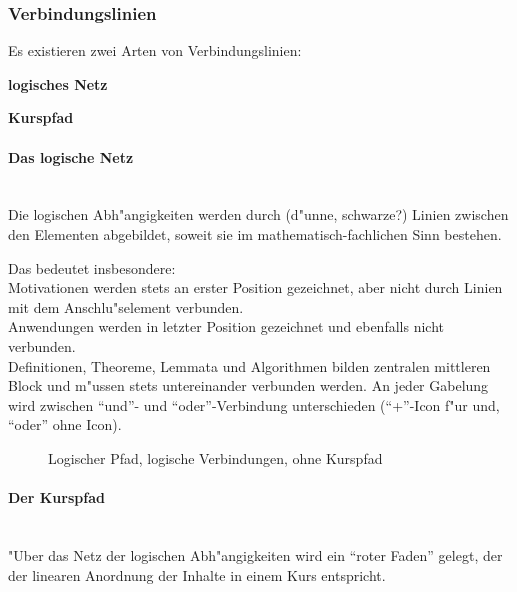 \clearpage

\subsubsection{Verbindungslinien}\label{}

Es existieren zwei Arten von Verbindungslinien: 

\begin{list_sabina}
        \item \textbf{logisches Netz}
        \item \textbf{Kurspfad} 
\end{list_sabina}


\paragraph{Das logische Netz}\mbox{ }\\[-2ex]

Die logischen Abh"angigkeiten werden durch (d"unne, schwarze?) Linien
zwischen den Elementen abgebildet, soweit sie im
mathematisch-fachlichen Sinn bestehen.

Das bedeutet insbesondere: \\
Motivationen werden stets an erster Position gezeichnet, aber nicht
durch Linien mit dem Anschlu"selement verbunden.\\
Anwendungen werden in letzter Position gezeichnet und ebenfalls nicht
verbunden.\\
Definitionen, Theoreme, Lemmata und Algorithmen bilden zentralen
mittleren Block und m"ussen stets untereinander verbunden werden. An
jeder Gabelung wird zwischen ``und''- und ``oder''-Verbindung
unterschieden (``+''-Icon f"ur und, ``oder'' ohne Icon).

\begin{figure}[h]
\begin{center}
\caption{Logischer Pfad, logische Verbindungen, ohne Kurspfad}
\end{center}
\end{figure}

\clearpage

\paragraph{Der Kurspfad}\mbox{ }\\[-2ex]

"Uber das Netz der logischen Abh"angigkeiten wird ein ``roter Faden''
gelegt, der der linearen Anordnung der Inhalte in einem Kurs
entspricht.

